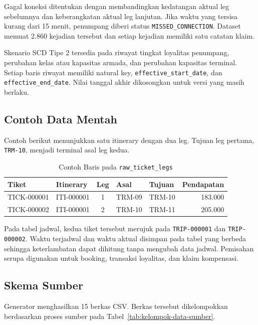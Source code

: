 Gagal koneksi ditentukan dengan membandingkan kedatangan aktual leg sebelumnya
dan keberangkatan aktual leg lanjutan. Jika waktu yang tersisa kurang dari 15
menit, penumpang diberi status \texttt{MISSED\_CONNECTION}. Dataset memuat 2.860
kejadian tersebut dan setiap kejadian memiliki satu catatan klaim.

Skenario SCD Tipe 2 tersedia pada riwayat tingkat loyalitas penumpang, perubahan
kelas atau kapasitas armada, dan perubahan kapasitas terminal. Setiap baris
riwayat memiliki natural key, \texttt{effective\_start\_date}, dan
\texttt{effective\_end\_date}. Nilai tanggal akhir dikosongkan untuk versi yang
masih berlaku.

\subsection{Contoh Data Mentah}

Contoh berikut menunjukkan satu itinerary dengan dua leg. Tujuan leg pertama,
\texttt{TRM-10}, menjadi terminal asal leg kedua.

\begin{table}[htbp]
\centering
\small
\caption{Contoh Baris pada \texttt{raw\_ticket\_legs}}
\begin{tabular}{|l|l|c|l|l|r|}
\hline
\textbf{Tiket} & \textbf{Itinerary} & \textbf{Leg} & \textbf{Asal} &
\textbf{Tujuan} & \textbf{Pendapatan} \\
\hline
TICK-000001 & ITI-000001 & 1 & TRM-09 & TRM-10 & 183.000 \\
TICK-000002 & ITI-000001 & 2 & TRM-10 & TRM-11 & 205.000 \\
\hline
\end{tabular}
\end{table}

Pada tabel jadwal, kedua tiket tersebut merujuk pada
\texttt{TRIP-000001} dan \texttt{TRIP-000002}. Waktu terjadwal dan waktu aktual
disimpan pada tabel yang berbeda sehingga keterlambatan dapat dihitung tanpa
mengubah data jadwal. Pemisahan serupa digunakan untuk booking, transaksi
loyalitas, dan klaim kompensasi.

\subsection{Skema Sumber}

Generator menghasilkan 15 berkas CSV. Berkas tersebut dikelompokkan berdasarkan
proses sumber pada Tabel~\ref{tab:kelompok-data-sumber}.

